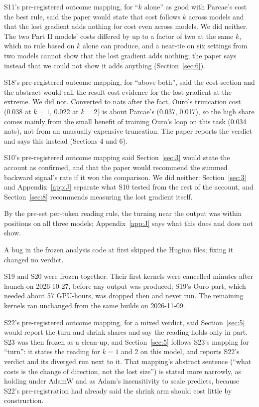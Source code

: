 \documentclass[10pt]{article}
\begin{document}
S11's pre-registered outcome mapping, for ``$k$ alone'' as good with Parcae's cost the best rule, said the paper would state that cost follows $k$ across models and that the lost gradient adds nothing for cost even across models. We did neither. The two Part II models' costs differed by up to a factor of two at the same $k$, which no rule based on $k$ alone can produce, and a near-tie on six settings from two models cannot show that the lost gradient adds nothing; the paper says instead that we could not show it adds anything (Section~\ref{sec:6}).

S18's pre-registered outcome mapping, for ``above both'', said the cost section and the abstract would call the result cost evidence for the lost gradient at the extreme. We did not. Converted to nats after the fact, Ouro's truncation cost (0.038 at $k = 1$, 0.022 at $k = 2$) is about Parcae's (0.037, 0.017), so the high share comes mainly from the small benefit of training Ouro's loop on this task (0.034 nats), not from an unusually expensive truncation. The paper reports the verdict and says this instead (Sections 4 and 6).

S10's pre-registered outcome mapping said Section~\ref{sec:3} would state the account as confirmed, and that the paper would recommend the summed backward signal's rate if it won the comparison. We did neither: Section~\ref{sec:3} and Appendix~\ref{app:J} separate what S10 tested from the rest of the account, and Section~\ref{sec:8} recommends measuring the lost gradient itself.

By the pre-set per-token reading rule, the turning near the output was within positions on all three models; Appendix~\ref{app:J} says what this does and does not show.

A bug in the frozen analysis code at first skipped the Huginn files; fixing it changed no verdict.

S19 and S20 were frozen together. Their first kernels were cancelled minutes after launch on 2026-10-27, before any output was produced; S19's Ouro part, which needed about 57 GPU-hours, was dropped then and never run. The remaining kernels ran unchanged from the same builds on 2026-11-09.

S22's pre-registered outcome mapping, for a mixed verdict, said Section~\ref{sec:5} would report the turn and shrink shares and say the reading holds only in part. S23 was then frozen as a clean-up, and Section~\ref{sec:5} follows S23's mapping for ``turn'': it states the reading for $k = 1$ and 2 on this model, and reports S22's verdict and its diverged run next to it. That mapping's abstract sentence (``what costs is the change of direction, not the lost size'') is stated more narrowly, as holding under AdamW and as Adam's insensitivity to scale predicts, because S22's pre-registration had already said the shrink arm should cost little by construction.
\end{document}
